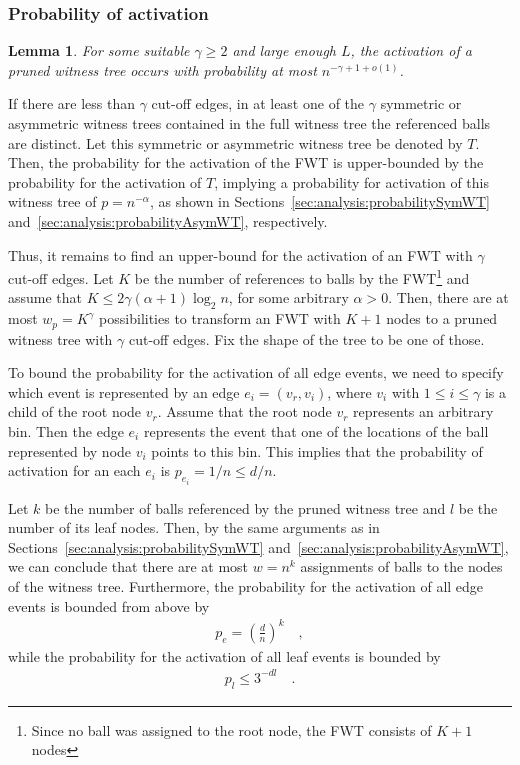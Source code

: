\documentclass[a4paper,12pt]{article}
\newtheorem{lemma}{Lemma}
\begin{document}
\subsubsection{Probability of activation}
\label{sec:analysis:probabilityFullWT}
\begin{lemma}\label{lemma:fwt:activation}
For some suitable $\gamma \geq 2$ and large enough $L$, the activation of a pruned witness tree occurs with probability at most $n^{-\gamma +1 +o(1)}$.
\end{lemma}
If there are less than $\gamma$ cut-off edges, in at least one of the $\gamma$ symmetric or asymmetric witness trees contained in the full witness tree the referenced balls are distinct. Let this symmetric or asymmetric witness tree be denoted by $T$. Then, the probability for the activation of the FWT is upper-bounded by the probability for the activation of $T$, implying a probability for activation of this witness tree of $p = n^{- \alpha}$, as shown in Sections~\ref{sec:analysis:probabilitySymWT} and~\ref{sec:analysis:probabilityAsymWT}, respectively.

Thus, it remains to find an upper-bound for the activation of an FWT with $\gamma$ cut-off edges. Let $K$ be the number of references to balls by the FWT\footnote{Since no ball was assigned to the root node, the FWT consists of $K+1$ nodes} and assume that $K  \leq 2 \gamma\left(\alpha+1\right) \log_2 n$, for some arbitrary $\alpha > 0$. Then, there are at most $w_p=K^\gamma$ possibilities to transform an FWT with $K+1$ nodes to a pruned witness tree with $\gamma$ cut-off edges. Fix the shape of the tree to be one of those. 

To bound the probability for the activation of all edge events, we need to specify which event is represented by an edge $e_i = (v_r, v_i)$, where $v_i$ with $1 \leq i \leq \gamma$ is a child of the root node $v_r$. Assume that the root node $v_r$ represents an arbitrary bin. Then the edge $e_i$ represents the event that one of the locations of the ball represented by node $v_i$ points to this bin. This implies that the probability of activation for an each $e_i$ is $p_{e_i} = 1/n \leq d/n$. 

Let $k$ be the number of balls referenced by the pruned witness tree and $l$ be the number of its leaf nodes. Then, by the same arguments as in Sections~\ref{sec:analysis:probabilitySymWT} and~\ref{sec:analysis:probabilityAsymWT}, we can conclude that there are at most $w=n^k$ assignments of balls to the nodes of the witness tree. Furthermore, the probability for the activation of all edge events is bounded from above by 
\begin{align*}
p_e = \left(\frac{d}{n}\right)^{k}\quad ,
\end{align*}
while the probability for the activation of all leaf events is bounded by 
\begin{align*}
p_l \leq 3^{-d l}\quad .
\end{align*} 
\end{document}
